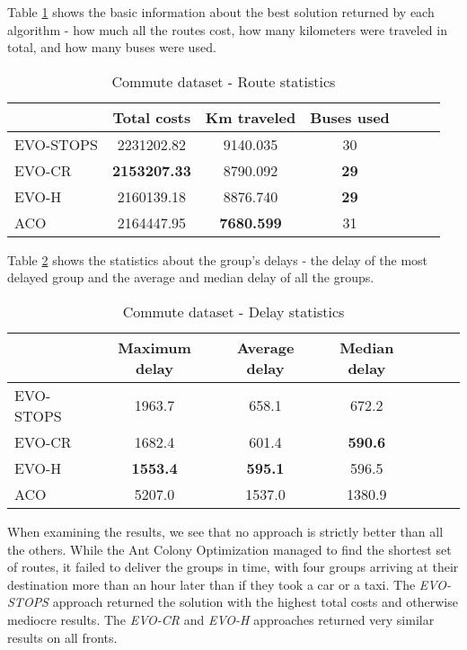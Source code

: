 Table \ref{tab:exp_commute_route_stats} shows the basic information about the best solution returned by each algorithm - how much all the routes cost, how many kilometers were traveled in total, and how many buses were used. 

\begin{table}
    \centering
    \begin{tabular}{lcccccc}
         & Total costs & Km traveled & Buses used \\
         \hline
         EVO-STOPS & 2231202.82 & 9140.035 & 30 \\
         EVO-CR & \textbf{2153207.33} & 8790.092 & \textbf{29} \\
         EVO-H & 2160139.18 & 8876.740 & \textbf{29} \\
         ACO & 2164447.95 & \textbf{7680.599} & 31 \\
    \end{tabular}
    \caption{Commute dataset - Route statistics}
    \label{tab:exp_commute_route_stats}
\end{table}

Table \ref{tab:exp_commute_delay_stats} shows the statistics about the group's delays - the delay of the most delayed group and the average and median delay of all the groups.

\begin{table}
    \centering
    \begin{tabular}{lcccccc}
         &  Maximum delay & Average delay & Median delay \\
         \hline
         EVO-STOPS & 1963.7 & 658.1 & 672.2 \\
         EVO-CR & 1682.4 & 601.4 & \textbf{590.6} \\
         EVO-H & \textbf{1553.4} & \textbf{595.1} & 596.5 \\
         ACO & 5207.0 & 1537.0 & 1380.9 \\
    \end{tabular}
    \caption{Commute dataset - Delay statistics}
    \label{tab:exp_commute_delay_stats}
\end{table}

When examining the results, we see that no approach is strictly better than all the others. While the Ant Colony Optimization managed to find the shortest set of routes, it failed to deliver the groups in time, with four groups arriving at their destination more than an hour later than if they took a car or a taxi. The \textit{EVO-STOPS} approach returned the solution with the highest total costs and otherwise mediocre results. The \textit{EVO-CR} and \textit{EVO-H} approaches returned very similar results on all fronts.